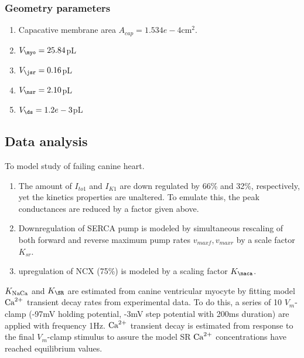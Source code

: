 \subsubsection{Geometry parameters}
\label{sec:geometry-parameters}

\begin{enumerate}
\item Capacative membrane area $A_{cap}=1.534e-4$cm$^2$.
\item $V_\myo=25.84$pL
\item $V_\jsr=0.16$pL
\item $V_\nsr=2.10$pL
\item $V_\ds=1.2e-3$pL
\end{enumerate}



\subsection{Data analysis}
\label{sec:data-analysis}

To model study of failing canine heart.
\begin{enumerate}
\item The amount of $I_{to1}$ and $I_{K1}$ are down regulated by 66\%
  and 32\%, respectively, yet the kinetics properties are
  unaltered. To emulate this, the peak conductances are reduced by a
  factor given above.

\item Downregulation of SERCA pump is modeled by simultaneous
  rescaling of both forward and reverse maximum pump rates
  $v_{maxf},v_{maxr}$ by a scale factor $K_{sr}$. 

\item upregulation of NCX (75\%) is modeled by a scaling factor
  $K_\naca$.
\end{enumerate}

$K_{\text{NaCa}}$ and $K_\SR$ are estimated from canine ventricular myocyte by
fitting model ${\text{Ca}^{2+}}$ transient decay rates from experimental data. To
do this, a series of 10 $V_m$-clamp (-97mV holding potential, -3mV
step potential with 200ms duration) are applied with frequency
1Hz. ${\text{Ca}^{2+}}$ transient decay is estimated from response to the final
$V_m$-clamp stimulus to assure the model SR ${\text{Ca}^{2+}}$ concentrations have
reached equilibrium values. 

